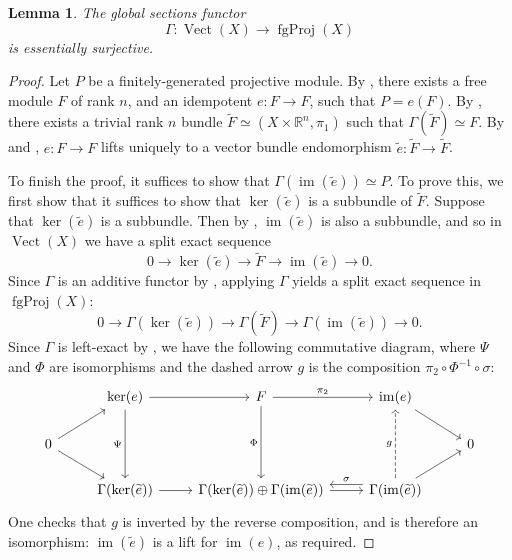 \documentclass[11pt]{article}
\newcommand{\R}{\mathbb{R}}
\newcommand{\Vect}{\operatorname{Vect}}
\newcommand{\fgProj}{\operatorname{fgProj}}
\newcommand{\im}{\operatorname{im}}
\renewcommand{\ker}{\operatorname{ker}}
\theoremstyle{plain}
\newtheorem{lemma}{Lemma}[section]
\theoremstyle{definition}
\begin{document}
\begin{lemma}\label{lemma:global-sections-essentially-surjective}
  The global sections functor
  \[\Gamma : \Vect(X) \longrightarrow \fgProj(X)\]
  is essentially surjective.
\end{lemma}
\begin{proof}
  Let \(P\) be a finitely-generated projective module. By , there exists a free module \(F\) of rank \(n\), and an idempotent \(e : F \to F\), such that \(P = e(F)\). By , there exists a trivial rank \(n\) bundle \(\widetilde{F} \simeq (X \times \R^n, \pi_1)\) such that \(\Gamma(\widetilde{F}) \simeq F\). By  and , \(e : F \to F\) lifts uniquely to a vector bundle endomorphism \(\widetilde{e} : \widetilde{F} \to \widetilde{F}\).

  To finish the proof, it suffices to show that \(\Gamma(\im(\widetilde{e})) \simeq P\). To prove this, we first show that it suffices to show that \(\ker(\widetilde{e})\) is a subbundle of \(\widetilde{F}\). Suppose that \(\ker(\widetilde{e})\) is a subbundle. Then by , \(\im(\widetilde{e})\) is also a subbundle, and so in \(\Vect(X)\) we have a split exact sequence
  \[
0 \to \ker(\widetilde{e}) \to \widetilde{F} \to \im(\widetilde{e}) \to 0.
  \]
  Since \(\Gamma\) is an additive functor by , applying \(\Gamma\) yields a split exact sequence in \(\fgProj(X)\):
  \[
0 \to \Gamma(\ker(\widetilde{e})) \to \Gamma(\widetilde{F}) \to \Gamma(\im(\widetilde{e})) \to 0.
\]
Since \(\Gamma\) is left-exact by , we have the following commutative diagram, where \(\Psi\) and \(\Phi\) are isomorphisms and the dashed arrow \(g\) is the composition \(\pi_2 \circ \Phi^{-1} \circ \sigma\):
\[
  \begin{tikzcd}
    & \ker(e) \arrow[swap]{dd}{\Psi} \arrow{r}& F \arrow[swap]{dd}{\Phi} \arrow{r}{\pi_2} & \im(e) \arrow{rd}& \\
  0 \arrow{ur} \arrow{dr}  & & & & 0\\
    & \Gamma(\ker(\widetilde{e})) \arrow{r}& \Gamma(\ker(\widetilde{e})) \oplus \Gamma(\im(\widetilde{e})) \arrow{r} & \Gamma(\im(\widetilde{e})) \arrow[swap, shift right = 1ex]{l}{\sigma} \arrow[dashed]{uu}{g} \arrow{ru} &
  \end{tikzcd}
\]
One checks that \(g\) is inverted by the reverse composition, and is therefore an isomorphism: \(\im(\widetilde{e})\) is a lift for \(\im(e)\), as required.


\end{proof}
\end{document}
